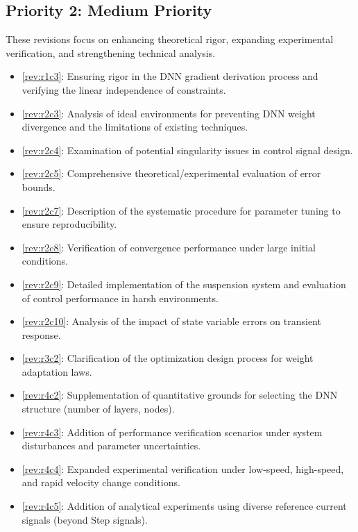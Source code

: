 \documentclass[12pt,english]{reviewresponse}
\begin{document}
\subsection*{Priority 2: Medium Priority}
These revisions focus on enhancing theoretical rigor, expanding experimental verification, and strengthening technical analysis.
\begin{itemize}
    \item \cref{rev:r1c3}: Ensuring rigor in the DNN gradient derivation process and verifying the linear independence of constraints.
    \item \cref{rev:r2c3}: Analysis of ideal environments for preventing DNN weight divergence and the limitations of existing techniques.
    \item \cref{rev:r2c4}: Examination of potential singularity issues in control signal design.
    \item \cref{rev:r2c5}: Comprehensive theoretical/experimental evaluation of error bounds.
    \item \cref{rev:r2c7}: Description of the systematic procedure for parameter tuning to ensure reproducibility.
    \item \cref{rev:r2c8}: Verification of convergence performance under large initial conditions.
    \item \cref{rev:r2c9}: Detailed implementation of the suspension system and evaluation of control performance in harsh environments.
    \item \cref{rev:r2c10}: Analysis of the impact of state variable errors on transient response.
    \item \cref{rev:r3c2}: Clarification of the optimization design process for weight adaptation laws.
    \item \cref{rev:r4c2}: Supplementation of quantitative grounds for selecting the DNN structure (number of layers, nodes).
    \item \cref{rev:r4c3}: Addition of performance verification scenarios under system disturbances and parameter uncertainties.
    \item \cref{rev:r4c4}: Expanded experimental verification under low-speed, high-speed, and rapid velocity change conditions.
    \item \cref{rev:r4c5}: Addition of analytical experiments using diverse reference current signals (beyond Step signals).
\end{itemize}
\end{document}
